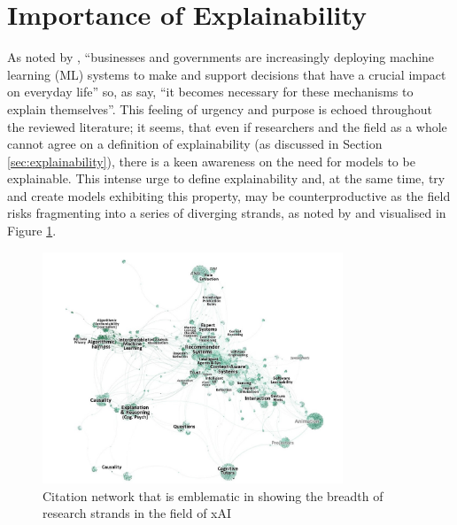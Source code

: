 \section{Importance of Explainability} \label{sec:importance-of-explainability}
As noted by \citet{edwards2018enslaving}, \enquote{businesses and governments are increasingly deploying machine learning (ML) systems to make and support decisions that have a crucial impact on everyday life} so, as \citet{gilpin2018explaining} say, \enquote{it becomes necessary for these mechanisms to explain themselves}.
This feeling of urgency and purpose is echoed throughout the reviewed literature; it seems, that even if researchers and the field as a whole cannot agree on a definition of explainability (as discussed in Section \ref{sec:explainability}), there is a keen awareness on the need for models to be explainable.
This intense urge to define explainability and, at the same time, try and create models exhibiting this property, may be counterproductive as the field risks fragmenting into a series of diverging strands, as noted by \citet{abdul2018trends} and visualised in Figure \ref{fig:xai-citation-network}.

\begin{figure}[htbp]
\centerline{\includegraphics[width=0.8\textwidth]{literature-review/images/xai-citation-network}}
\caption{Citation network that is emblematic in showing the breadth of research strands in the field of xAI \citep{abdul2018trends}}
\label{fig:xai-citation-network}
\end{figure}

